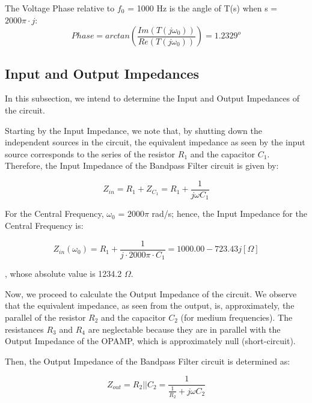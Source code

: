 The Voltage Phase relative to $f_0$ = 1000 Hz is the angle of T(s) when s = $2000\pi\cdot j$:
\begin{equation}
	Phase = arctan \left(\frac{Im(T(j\omega_0))}{Re(T(j\omega_0))} \right) = 1.2329^o
	\label{eq:phaseTheoretical}
\end{equation}

\subsection{Input and Output Impedances}	\label{sec:inOutImpedances}

In this subsection, we intend to determine the Input and Output Impedances of the circuit.

Starting by the Input Impedance, we note that, by shutting down the independent sources in the circuit, the equivalent impedance as seen by the input source corresponds to the series of the resistor $R_1$ and the capacitor $C_1$. Therefore, the Input Impedance of the Bandpass Filter circuit is given by:

\begin{equation}
	Z_{in} = R_1 + Z_{C_1} = R_1 + \frac{1}{j\omega C_1}
	\label{eq:inputImpedance}
\end{equation} 

For the Central Frequency, $\omega_0$ = $2000\pi$ rad/s; hence, the Input Impedance for the Central Frequency is:

\begin{equation}
	Z_{in}(\omega_0) = R_1 + \frac{1}{j\cdot 2000\pi \cdot C_1} = 1000.00 -  723.43j [\Omega]
	\label{eq:inputImpVal}
\end{equation}

, whose absolute value is 1234.2 $\Omega$.

Now, we proceed to calculate the Output Impedance of the circuit. We observe that the equivalent impedance, as seen from the output, is, approximately, the parallel of the resistor $R_2$ and the capacitor $C_2$ (for medium frequencies). The resistances $R_3$ and $R_4$ are neglectable because they are in parallel with the Output Impedance of the OPAMP, which is approximately null (short-circuit).

Then, the Output Impedance of the Bandpass Filter circuit is determined as: 

\begin{equation}
	Z_{out} = R_2 || C_2 = \frac{1}{\frac{1}{R_2} + j\omega C_2}
	\label{eq:outputImpedance}
\end{equation}



